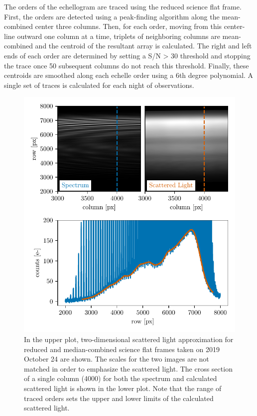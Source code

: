 The orders of the echellogram are traced using the reduced science flat frame. First, the orders are detected using a peak-finding algorithm along the mean-combined center three columns. Then, for each order, moving from this center-line outward one column at a time, triplets of neighboring columns are mean-combined and the centroid of the resultant array is calculated. The right and left ends of each order are determined by setting a S/N > 30 threshold and stopping the trace once 50 subsequent columns do not reach this threshold. Finally, these centroids are smoothed along each echelle order using a 6th degree polynomial. A single set of traces is calculated for each night of observations.

\begin{figure}
    \centering
    \includegraphics[width=\textwidth]{figures-4/scat_light.pdf}
    \caption{In the upper plot, two-dimensional scattered light approximation for reduced and median-combined science flat frames taken on 2019 October 24 are shown. The scales for the two images are not matched in order to emphasize the scattered light. The cross section of a single column (4000) for both the spectrum and calculated scattered light is shown in the lower plot. Note that the range of traced orders sets the upper and lower limits of the calculated scattered light.}
    \label{fig:scattered_light}
\end{figure}

